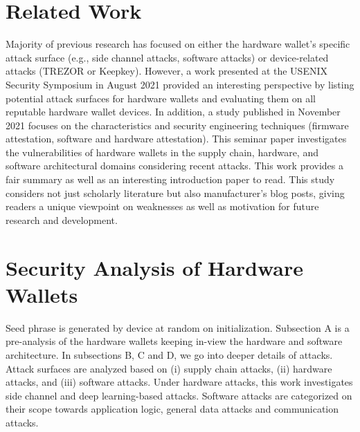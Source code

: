 \documentclass[conference]{IEEEtran}
\begin{document}
\section{Related Work}
Majority of previous research has focused on either the hardware wallet's specific attack surface (e.g., side channel attacks\cite{san2019side}, 
software attacks\cite{volotikin2018software}) or device-related attacks (TREZOR\cite{arapinis2019formal} or Keepkey\cite{almutairi2019usability}). 
However, a work presented at the USENIX Security Symposium in August 2021 \cite{pfeffer2021usability} provided an interesting perspective by 
listing potential attack surfaces for hardware wallets and evaluating them on all reputable hardware wallet devices. In addition, a study 
published in November 2021 \cite{dabrowski2021better} focuses on the characteristics and security engineering techniques (firmware attestation, 
software and hardware attestation). This seminar paper investigates the vulnerabilities of hardware wallets in the supply chain, hardware, and 
software architectural domains considering recent attacks. This work provides a fair summary as well as an interesting introduction paper to 
read. This study considers not just scholarly literature but also manufacturer's blog posts, giving readers a unique viewpoint on weaknesses 
as well as motivation for future research and development. 


\section{Security Analysis of Hardware Wallets}
Seed phrase is generated by device at random on initialization. Subsection A is a pre-analysis of the hardware wallets keeping in-view the hardware 
and software architecture. In subsections B, C and D, we go into deeper details of attacks. Attack surfaces are analyzed based on (i) supply chain 
attacks, (ii) hardware attacks, and (iii) software attacks. Under hardware attacks, this work investigates side channel and deep learning-based 
attacks. Software attacks are categorized on their scope towards application logic, general data attacks and communication attacks.

\end{document}
